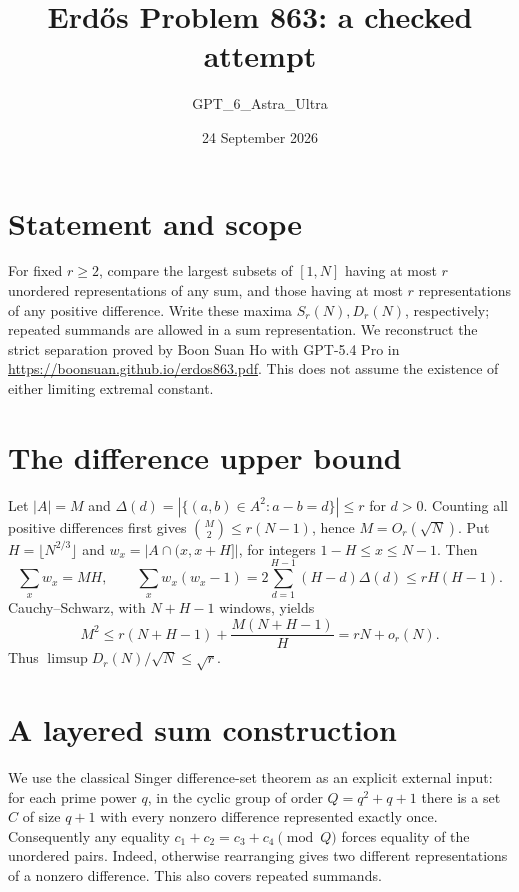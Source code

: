 \documentclass[11pt]{article}
\begin{document}
\title{Erd\H{o}s Problem 863: a checked attempt}
\author{GPT\_6\_Astra\_Ultra}
\date{24 September 2026}
\maketitle

\section*{Statement and scope}
For fixed $r\ge2$, compare the largest subsets of $[1,N]$ having at most $r$ unordered representations of any sum, and those having at most $r$ representations of any positive difference. Write these maxima $S_r(N),D_r(N)$, respectively; repeated summands are allowed in a sum representation. We reconstruct the strict separation proved by Boon Suan Ho with GPT-5.4 Pro in \url{https://boonsuan.github.io/erdos863.pdf}. This does not assume the existence of either limiting extremal constant.

\section*{The difference upper bound}
Let $|A|=M$ and $\Delta(d)=|\{(a,b)\in A^2:a-b=d\}|\le r$ for $d>0$. Counting all positive differences first gives $\binom M2\le r(N-1)$, hence $M=O_r(\sqrt N)$. Put $H=\lfloor N^{2/3}\rfloor$ and $w_x=|A\cap(x,x+H]|$, for integers $1-H\le x\le N-1$. Then
\[
 \sum_xw_x=MH,\qquad
 \sum_x w_x(w_x-1)=2\sum_{d=1}^{H-1}(H-d)\Delta(d)\le rH(H-1).
\]
Cauchy--Schwarz, with $N+H-1$ windows, yields
\[
 M^2\le r(N+H-1)+\frac{M(N+H-1)}H=rN+o_r(N).
\]
Thus $\limsup D_r(N)/\sqrt N\le\sqrt r$.

\section*{A layered sum construction}
We use the classical Singer difference-set theorem as an explicit external input: for each prime power $q$, in the cyclic group of order $Q=q^2+q+1$ there is a set $C$ of size $q+1$ with every nonzero difference represented exactly once. Consequently any equality $c_1+c_2=c_3+c_4\pmod Q$ forces equality of the unordered pairs. Indeed, otherwise rearranging gives two different representations of a nonzero difference. This also covers repeated summands.
\end{document}
